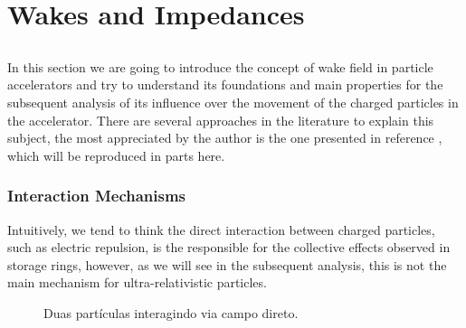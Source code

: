 \chapter{Wakes and Impedances}\label{cap:wake_impedances}

\section{}

In this section we are going to introduce the concept of wake field in particle accelerators and try to understand its foundations and main properties for the subsequent analysis of its influence over the movement of the charged particles in the accelerator. There are several approaches in the literature to explain this subject, the most appreciated by the author is the one presented in reference \cite{Stupakov2000a}, which will be reproduced in parts here.

\subsection{Interaction Mechanisms}\label{ssec:interation_mechanisms}

Intuitively, we tend to think the direct interaction between charged particles, such as electric repulsion, is the responsible for the collective effects observed in storage rings, however, as we will see in the subsequent analysis, this is not the main mechanism for ultra-relativistic particles.

\begin{figure}[hb!]
\centering
\label{fig:wake1}
\caption{Duas partículas interagindo via campo direto.}
\end{figure}

